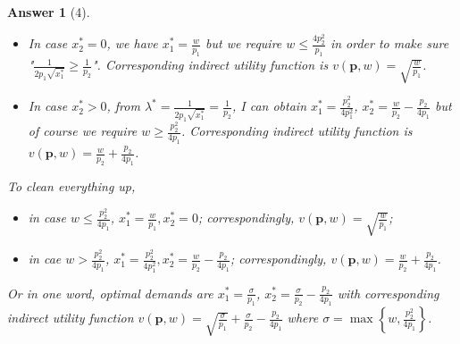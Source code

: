 \documentclass{article}
\newtheorem*{ans}{Answer}
\newcommand{\1}{{\bf 1}}
\newcommand{\0}{{\mathbf{0}}}
\newcommand{\p}{{\mathbf{p}}}
\newcommand{\<}{\langle}
\renewcommand{\>}{\rangle}
\begin{document}
\begin{ans}[4]
\begin{enumerate}[(a)]
		\begin{itemize}
			\item In case $x_2^* =0$, we have $x_1^* = \frac{w}{p_1}$ but we require $ w \le \frac{4 p_2^2}{p_1}$ in order to make sure "$ \frac1{2 p_1\sqrt{x_1^*}} \ge \frac1{p_2 }$". Corresponding indirect utility function is $v(\p,w) = \sqrt{\frac{w}{p_1}}$.
			\item In case $x_2^* >0$, from  $\lambda^* = \frac1{2 p_1\sqrt{x_1^*}} = \frac1{p_2} $, I can obtain $x_1^* = \frac{p_2^2}{4p_1^2}$, $x_2^* = \frac{w} {p_2} - \frac{p_2}{4p_1 }$ but of course we require $w \ge \frac{ p_2^2}{ 4 p_1}$. Corresponding indirect utility function is $v(\p,w) =\frac{w} {p_2} +\frac{p_2}{4p_1 }$. 
		\end{itemize}
	
	To clean everything up,
	\begin{itemize}
		\item in case $w \le \frac{ p_2^2}{ 4 p_1}$, $x_1^* = \frac{w}{p_1},x_2^* =0$; correspondingly, $v(\p,w) = \sqrt{\frac{w}{p_1}}$;
		\item in cae $w > \frac{ p_2^2}{ 4 p_1}$, $x_1^* = \frac{p_2^2}{4p_1^2}, x_2^* = \frac{w}{p_2} - \frac{p_2}{4 p_1}$; correspondingly, $v(\p,w) =\frac{w} {p_2} +\frac{p_2}{4p_1 }$. 
	\end{itemize} 
Or in one word, optimal demands are $x_1^* = \frac{\sigma}{p_1}$, $x_2^* = \frac{\sigma}{p_2} - \frac{p_2}{4 p_1}$
with corresponding indirect utility function $v(\p, w)  = \sqrt{\frac{\sigma}{p_1}} + \frac{\sigma}{p_2} - \frac{p_2}{4 p_1}$ where 
$ \sigma = \max\left\{w, \frac{p_2^2}{4p_1} \right\}$.
	\end{enumerate}
\end{ans}
\end{document}
